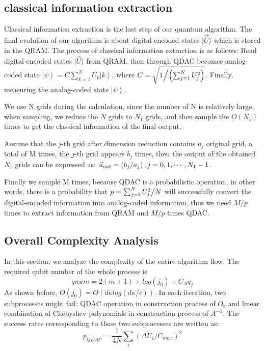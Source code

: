 \documentclass[%
 reprint,
 amsmath,amssymb,
pra,
]{revtex4-1}
\begin{document}
\subsection{classical information extraction}
Classical information extraction is the last step of our quantum algorithm. 
The final evolution of our algorithm is about digital-encoded states
$|\vec{U}\rangle$ which is stored in the QRAM. 
The process of classical information extraction is as follows: 
Read digital-encoded states $|\vec{U}\rangle$ from QRAM, 
then through QDAC becomes analog-coded state $\left| \psi  \right\rangle  = C\sum\limits_{k = 1}^N {{U_k}\left| k \right\rangle } $,
where $C = \sqrt {{1 \mathord{\left/
{\vphantom {1 {\left( {\sum\nolimits_{j = 1}^N {U_j^2} } \right)}}} \right.
\kern-\nulldelimiterspace} {\left( {\sum\nolimits_{j = 1}^N {U_j^2} } \right)}}} $.
Finally, measuring the analog-coded state $\left| \psi  \right\rangle $.

We use N grids during the calculation,
since the number of N is relatively large,
when sampling, we reduce the $N$ grids to $N_1$ grids, 
and then sample the $O(N_1)$ times to get the classical information of the final output.

Assume that the $j$-th grid after dimension reduction contains $a_j$ original grid,
a total of M times, the $j$-th grid appears $b_j$ times, then the output of the obtained $N_1$ grids can be expressed as: ${\vec u_{out}} = \left( {{{{b_j}} \mathord{\left/
{\vphantom {{{b_j}} {{a_j}}}} \right. \kern-\nulldelimiterspace} {{a_j}}}} \right),j = 0,1, \cdots ,{N_1} - 1$.

Finally we sample M times,
because QDAC is a probabilistic operation,
in other words, 
there is a probability that $p = \sum\nolimits_{j = 1}^N {{{U_j^2} \mathord{\left/
{\vphantom {{U_j^2} N}} \right. \kern-\nulldelimiterspace} N}} $ will successfully convert 
the digital-encoded information into analog-coded information,
thus we need $M/p$ times to extract information from QRAM and $M/p$ times QDAC.



\subsection{Overall Complexity Analysis}

In this section, we analyze the complexity of the entire algorithm flow. The required qubit number of the whole process is 
$$
qnum=2(m+1)+log(j_0)+C_Aq_f
$$
As shown before, $O(j_0)=O(d\kappa log(d\kappa/\epsilon))$.
In each iteration, two subprocesses might fail: QDAC operation in construction process of $O_b$ and linear combination of Chebyshev polynomials in construction process of $A^{-1}$. The success rates corresponding to these two subprocesses are written as:
$$
p_{QDAC}=\frac{1}{4N}\sum_i{(\Delta U_i/C_{max})^2}
$$
\end{document}
